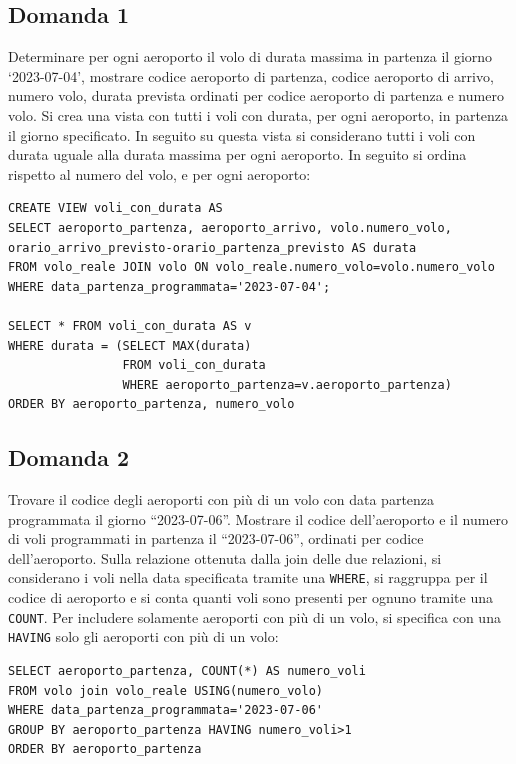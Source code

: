 \documentclass{article}
\numberwithin{equation}{subsection}
\begin{document}
\subsection{Domanda 1}

Determinare per ogni aeroporto il volo di durata massima in partenza il giorno `2023-07-04', mostrare codice aeroporto di partenza, codice aeroporto di arrivo, 
numero volo, durata prevista ordinati per codice aeroporto di partenza e numero volo. Si crea una vista con tutti i voli con durata, per ogni aeroporto, in partenza 
il giorno specificato. In seguito su questa vista si considerano tutti i voli con durata uguale alla durata massima per ogni aeroporto. In seguito si ordina rispetto 
al numero del volo, e per ogni aeroporto:


\begin{verbatim}
CREATE VIEW voli_con_durata AS
SELECT aeroporto_partenza, aeroporto_arrivo, volo.numero_volo, orario_arrivo_previsto-orario_partenza_previsto AS durata
FROM volo_reale JOIN volo ON volo_reale.numero_volo=volo.numero_volo
WHERE data_partenza_programmata='2023-07-04';

SELECT * FROM voli_con_durata AS v 
WHERE durata = (SELECT MAX(durata)
                FROM voli_con_durata
                WHERE aeroporto_partenza=v.aeroporto_partenza)
ORDER BY aeroporto_partenza, numero_volo
\end{verbatim}

\subsection{Domanda 2}

Trovare il codice degli aeroporti con più di un volo con data partenza programmata il giorno ``2023-07-06''. Mostrare il codice dell'aeroporto e il numero di voli 
programmati in partenza il ``2023-07-06'', ordinati per codice dell'aeroporto. Sulla relazione ottenuta dalla join delle due relazioni, si considerano i voli nella 
data specificata tramite una \verb|WHERE|, si raggruppa per il codice di aeroporto e si conta quanti voli sono presenti per ognuno tramite una \verb|COUNT|. Per 
includere solamente aeroporti con più di un volo, si specifica con una \verb|HAVING| solo gli aeroporti con più di un volo:

\begin{verbatim}
SELECT aeroporto_partenza, COUNT(*) AS numero_voli
FROM volo join volo_reale USING(numero_volo)
WHERE data_partenza_programmata='2023-07-06'
GROUP BY aeroporto_partenza HAVING numero_voli>1
ORDER BY aeroporto_partenza
\end{verbatim}
\end{document}
